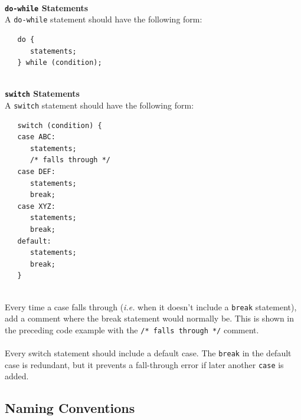 \documentclass{CSSRforAfrica}
\newcommand{\blank}{~\\}
\begin{document}
\begin{appendices}
{\begin{verbatim}
\end{verbatim}
}
\blank
{\bf { \tt do-while} Statements}\\
A {\small \verb+do-while+} statement should have the following form:
{\small
\begin{verbatim}
   do {
      statements;
   } while (condition); 
\end{verbatim}
}
\blank
{\bf  { \tt switch} Statements}\\
A {\small \verb+switch+} statement should have the following form:
{\small
\begin{verbatim}
   switch (condition) {
   case ABC:
      statements;
      /* falls through */
   case DEF:
      statements;
      break;
   case XYZ:
      statements;
      break;
   default:
      statements;
      break;
   }
\end{verbatim}
}
\blank
Every time a case falls through ({\em i.e.} when it doesn't include a {\small \verb+break+} statement), 
add a comment where the break statement would normally be. 
This is shown in the preceding code example with the
{\small \verb+/* falls through */+} comment.
\blank
~
\blank
Every switch statement should include a default case. The {\small \verb+break+} in the default case is
redundant, but it prevents a fall-through error if later another {\small \verb+case+} is added.
 
 


\subsection{Naming Conventions}
 

\end{appendices}
\end{document}
